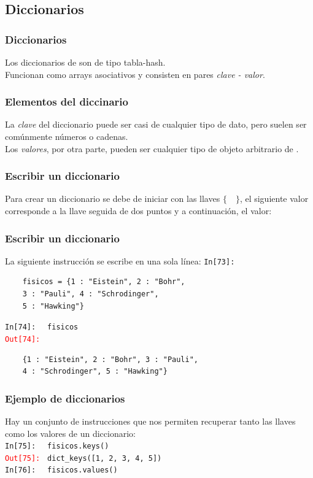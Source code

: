 {\subsection{Diccionarios}
\begin{frame}
\frametitle{Diccionarios}
Los diccionarios de \python{} son de tipo tabla-hash.
\\
\bigskip
Funcionan como arrays asociativos y consisten en pares \emph{clave - valor}.
\end{frame}
\begin{frame}
\frametitle{Elementos del diccinario}
La \emph{clave} del diccionario puede ser casi de cualquier tipo  de dato, pero suelen ser comúnmente números o cadenas.
\\
\bigskip
Los \emph{valores}, por otra parte, pueden ser cualquier tipo de objeto arbitrario de \python.
\end{frame}
\begin{frame}[fragile]
\frametitle{Escribir un diccionario}
Para crear un diccionario se debe de iniciar con las llaves $\{ \quad \}$, el siguiente valor corresponde a la llave seguida de dos puntos y a continuación, el valor:
\end{frame}
\begin{frame}[fragile]
\frametitle{Escribir un diccionario}
La siguiente instrucción se escribe en una sola línea:
\textcolor{ao}{\texttt{In[73]: }}
\\
\begin{verbatim}
	fisicos = {1 : "Eistein", 2 : "Bohr", 
	3 : "Pauli", 4 : "Schrodinger", 
	5 : "Hawking"}
\end{verbatim}
\pause
\textcolor{ao}{\texttt{In[74]: }} \verb| fisicos|
\\
\pause
\textcolor{red}{\texttt{Out[74]: }}
\\
\begin{verbatim}
	{1 : "Eistein", 2 : "Bohr", 3 : "Pauli",
	4 : "Schrodinger", 5 : "Hawking"}
\end{verbatim}
\end{frame}
\begin{frame}[fragile]
\frametitle{Ejemplo de diccionarios}
Hay un conjunto de instrucciones que nos permiten recuperar tanto las llaves como los valores de un diccionario:
\\
\bigskip
\textcolor{ao}{\texttt{In[75]: }} \verb| fisicos.keys()|
\\
\pause
\textcolor{red}{\texttt{Out[75]: }} \verb|dict_keys([1, 2, 3, 4, 5])|
\\
\bigskip
\textcolor{ao}{\texttt{In[76]: }} \verb| fisicos.values()|

\end{frame}}
